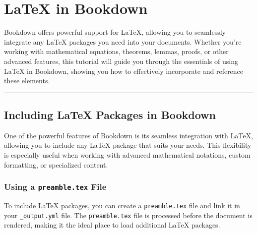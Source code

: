 \documentclass[
]{book}
\theoremstyle{definition}
\theoremstyle{definition}
\theoremstyle{definition}
\theoremstyle{definition}
\theoremstyle{remark}
\begin{document}
\chapter{LaTeX in Bookdown}\label{latex-in-bookdown}

Bookdown offers powerful support for LaTeX, allowing you to seamlessly integrate any LaTeX packages you need into your documents. Whether you're working with mathematical equations, theorems, lemmas, proofs, or other advanced features, this tutorial will guide you through the essentials of using LaTeX in Bookdown, showing you how to effectively incorporate and reference these elements.

\begin{center}\rule{0.5\linewidth}{0.5pt}\end{center}

\section{Including LaTeX Packages in Bookdown}\label{including-latex-packages-in-bookdown}

One of the powerful features of Bookdown is its seamless integration with LaTeX, allowing you to include any LaTeX package that suits your needs. This flexibility is especially useful when working with advanced mathematical notations, custom formatting, or specialized content.

\subsection{\texorpdfstring{Using a \texttt{preamble.tex} File}{Using a preamble.tex File}}\label{using-a-preamble.tex-file}

To include LaTeX packages, you can create a \texttt{preamble.tex} file and link it in your \texttt{\_output.yml} file. The \texttt{preamble.tex} file is processed before the document is rendered, making it the ideal place to load additional LaTeX packages.
\end{document}
